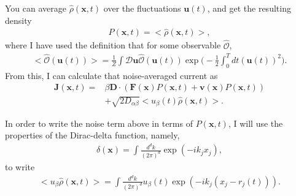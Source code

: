 \documentclass[../main.tex]{subfiles}
\begin{document}
You can average $\hat{\rho}(\bm{x},t)$ over the fluctuations $\bm{u}(t)$, and
get the resulting density
\begin{align}
  P(\bm{x},t)=<\hat{\rho}(\bm{x},t)>,
\end{align}
where I have used the definition that for some observable $\hat{\mathcal{O}}$,
\begin{align}
  <\hat{\mathcal{O}}(\bm{u}(t))>=\frac{1}{Z}\int\mathcal{D}\bm{u}
  \hat{\mathcal{O}}(\bm{u}(t))
  \exp\bigg(-\frac{1}{2}\int_0^Tdt(\bm{u}(t))^2\bigg).
\end{align}
From this, I can calculate that noise-averaged current as
\begin{align}
  \bm{J}(\bm{x},t)=
  &\beta\bm{D}\cdot(\bm{F}(\bm{x})P(\bm{x},t)
  +\bm{v}(\bm{x})P(\bm{x},t))\nonumber\\
  &+\sqrt{2D_{\alpha\beta}}<u_{\beta}(t)\hat{\rho}(\bm{x},t)>.
\end{align}

In order to write the noise term above in terms of $P(\bm{x},t)$, I will use
the properties of the Dirac-delta function, namely,
\begin{align}
  \delta(\bm{x})=\int\frac{d^dk}{(2\pi)^d}\exp(-ik_jx_j),
\end{align}
to write
\begin{align}
  <u_{\beta}\hat{\rho}(\bm{x},t)>=\int\frac{d^dk}{(2\pi)^d}u_{\beta}(t)
  \exp(-ik_j(x_j-r_j(t))).
\end{align}
\end{document}
